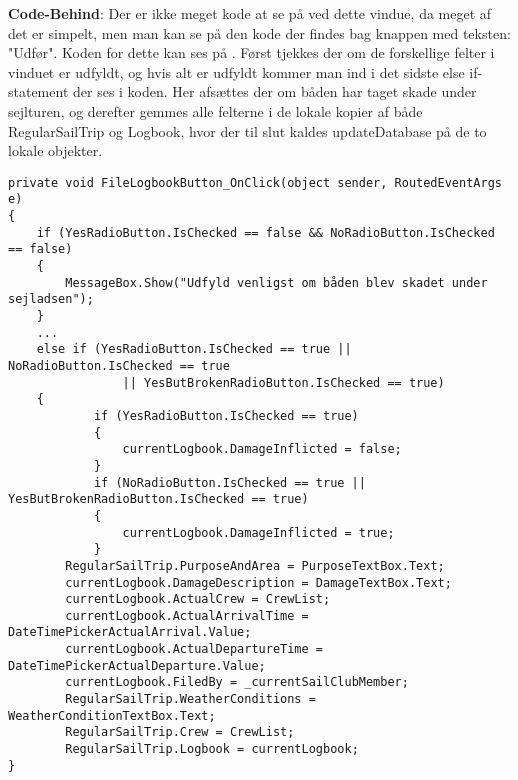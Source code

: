 \textbf{Code-Behind}: Der er ikke meget kode at se på ved dette vindue, da meget af det er simpelt, men man kan se på den kode der findes bag knappen med teksten: "Udfør".
Koden for dette kan ses på .
Først tjekkes der om de forskellige felter i vinduet er udfyldt, og hvis alt er udfyldt kommer man ind i det sidste else if-statement der ses i koden. 
Her afsættes der om båden har taget skade under sejlturen, og derefter gemmes alle felterne i de lokale kopier af både RegularSailTrip og Logbook, hvor der til slut kaldes updateDatabase på de to lokale objekter.

\begin{lstlisting}[frame=single, caption= Gem Logbog, label=SaveLogbookButton]
private void FileLogbookButton_OnClick(object sender, RoutedEventArgs e)
{
	if (YesRadioButton.IsChecked == false && NoRadioButton.IsChecked == false)
	{
	    MessageBox.Show("Udfyld venligst om båden blev skadet under sejladsen");
	}
	...
	else if (YesRadioButton.IsChecked == true || NoRadioButton.IsChecked == true
	            || YesButBrokenRadioButton.IsChecked == true) 
	{
	        if (YesRadioButton.IsChecked == true)
	        {
	            currentLogbook.DamageInflicted = false;
	        }      
	        if (NoRadioButton.IsChecked == true || YesButBrokenRadioButton.IsChecked == true)
	        {
	            currentLogbook.DamageInflicted = true;
	        }
	    RegularSailTrip.PurposeAndArea = PurposeTextBox.Text;
	    currentLogbook.DamageDescription = DamageTextBox.Text;
	    currentLogbook.ActualCrew = CrewList;
	    currentLogbook.ActualArrivalTime = DateTimePickerActualArrival.Value;
	    currentLogbook.ActualDepartureTime = DateTimePickerActualDeparture.Value;
	    currentLogbook.FiledBy = _currentSailClubMember;
	    RegularSailTrip.WeatherConditions = WeatherConditionTextBox.Text;
	    RegularSailTrip.Crew = CrewList;
	    RegularSailTrip.Logbook = currentLogbook;
}
\end{lstlisting}


